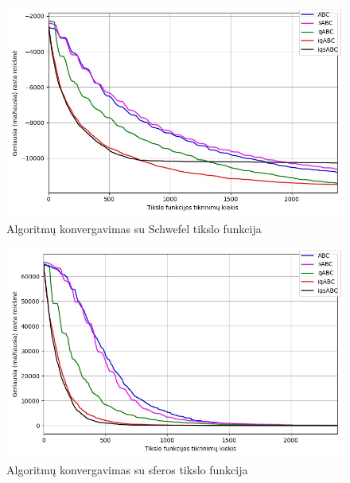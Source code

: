 \documentclass{VUMIFPSmagistrinis}
\begin{document}
\begin{landscape}
\begin{multicols}{2}
\begin{figure}[H]
    \centering
    \includegraphics[scale=0.45]{img/2kv/all_schwefel.jpg}
     \caption{Algoritmų konvergavimas su Schwefel tikslo funkcija}
    \label{img:kon7}
\end{figure}

\begin{figure}[H]
    \centering
    \includegraphics[scale=0.45]{img/2kv/all_Sphere.jpg}
     \caption{Algoritmų konvergavimas su sferos tikslo funkcija}
    \label{img:kon8}
\end{figure}





\end{multicols}
\begin{multicols}{2}


\end{multicols}
\end{landscape}
\end{document}
